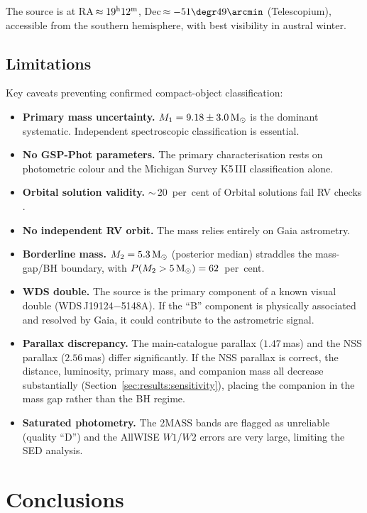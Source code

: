 \documentclass[usenatbib,fleqn]{mnras}
\newcommand{\Msun}{{\rm M}_\odot}
\begin{document}
The source is at RA\,$\approx 19^{\rm h}12^{\rm m}$,
Dec\,$\approx -51\degr49\arcmin$ (Telescopium), accessible from
the southern hemisphere, with best visibility in austral winter.

\subsection{Limitations}

Key caveats preventing confirmed compact-object classification:
\begin{itemize}
\item \textbf{Primary mass uncertainty.}  $M_1 = 9.18 \pm 3.0\,\Msun$
  is the dominant systematic.  Independent spectroscopic
  classification is essential.
\item \textbf{No GSP-Phot parameters.}  The primary characterisation
  rests on photometric colour and the Michigan Survey K5\,III
  classification alone.
\item \textbf{Orbital solution validity.}  $\sim$\,20~per~cent of
  Orbital solutions fail RV checks \citep{ElBadry2024}.
\item \textbf{No independent RV orbit.}  The mass relies entirely
  on Gaia astrometry.
\item \textbf{Borderline mass.}  $M_2 = 5.3\,\Msun$ (posterior
  median) straddles the mass-gap/BH boundary, with
  $P(M_2 > 5\,\Msun) = 62$~per~cent.
\item \textbf{WDS double.}  The source is the primary component of
  a known visual double (WDS\,J19124$-$5148A).  If the ``B''
  component is physically associated and resolved by Gaia, it
  could contribute to the astrometric signal.
\item \textbf{Parallax discrepancy.}  The main-catalogue parallax
  ($1.47$\,mas) and the NSS parallax ($2.56$\,mas) differ
  significantly.  If the NSS parallax is correct, the distance,
  luminosity, primary mass, and companion mass all decrease
  substantially (Section~\ref{sec:results:sensitivity}), placing
  the companion in the mass gap rather than the BH regime.
\item \textbf{Saturated photometry.}  The 2MASS bands are flagged
  as unreliable (quality ``D'') and the AllWISE $W1$/$W2$ errors
  are very large, limiting the SED analysis.
\end{itemize}

\section{Conclusions}
\label{sec:conclusions}
\end{document}
